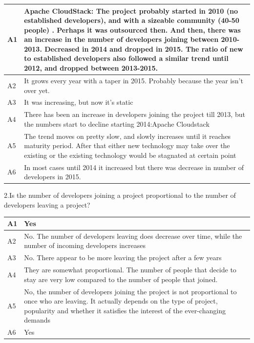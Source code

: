 \documentclass[double,12pt]{beavtex}
\begin{document}
\begin{tabular}{ |p{2cm}|p{12cm}| }
 \hline
 A1 & Apache CloudStack: The project probably started in 2010 (no established developers), and with a sizeable community (40-50 people) . Perhaps it was outsourced then. And then, there was an increase in the number of developers joining between 2010-2013. Decreased in 2014 and dropped in 2015. The ratio of new to established developers also followed a similar trend until 2012, and dropped between 2013-2015.\\
 \hline
 A2 & It grows every year with a taper in 2015. Probably because the year isn't over yet.\\ \hline
 A3 & It was increasing, but now it's static\\ \hline
 A4 & There has been an increase in developers joining the project till 2013, but the numbers start to decline starting 2014:Apache Cloudstack\\ \hline
 A5 & The trend moves on pretty slow, and slowly increases until it reaches maturity period. After that either new technology may take over the existing or the existing technology would be stagnated at certain point\\ \hline
 A6 & In most cases until 2014 it increased but there was decrease in number of developers in 2015.\\
 \hline
\end{tabular}


2.Is the number of developers joining a project proportional to the number of developers leaving a project?


\begin{tabular}{ |p{2cm}|p{12cm}| }
 \hline
 A1 & Yes\\
 \hline
 A2 & No. The number of developers leaving does decrease over time, while the number of incoming developers increases\\ \hline
 A3 & No. There appear to be more leaving the project after a few years\\ \hline
 A4 & They are somewhat proportional. The number of people that decide to stay are very low compared to the number of people that joined.\\ \hline
 A5 & No, the number of developers joining the project is not proportional to once who are leaving. It actually depends on the type of project, popularity and whether it satisfies the interest of the ever-changing demands\\ \hline
 A6 & Yes\\
 \hline
\end{tabular}
\end{document}
